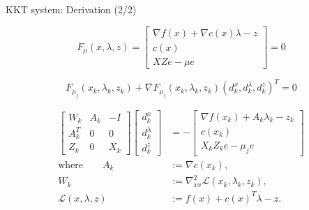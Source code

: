 \documentclass{beamer}
\begin{document}
\begin{frame}{KKT system: Derivation (2/2)}

  \[
    F_\mu(x,\lambda,z) =
    \begin{bmatrix}
      \nabla f(x) + \nabla c(x)\lambda - z \\
      c(x)                                 \\
      XZe - \mu e
    \end{bmatrix} = 0
  \]

  \[
    F_{\mu_j}(x_k,\lambda_k,z_k) + \nabla F_{\mu_j}(x_k,\lambda_k,z_k) (d_k^x, d_k^\lambda, d_k^z)^T = 0
  \]

  \vspace{-1.0em}

  \begin{align*}
    \begin{bmatrix}
      W_k   & A_k & -I  \\
      A_k^T & 0   & 0   \\
      Z_k   & 0   & X_k
    \end{bmatrix}
    \begin{bmatrix}
      d_k^x       \\
      d_k^\lambda \\
      d_k^z
    \end{bmatrix}
                             & =
    -
    \begin{bmatrix}
      \nabla f(x_k) + A_k \lambda_k - z_k \\
      c(x_k)                              \\
      X_k Z_k e - \mu_j e
    \end{bmatrix}                                        \\[0.8em]
    \text{where}\qquad
    A_k                      & := \nabla c(x_k),                               \\
    W_k                      & := \nabla^2_{xx}\mathcal{L}(x_k,\lambda_k,z_k), \\
    \mathcal{L}(x,\lambda,z) & := f(x) + c(x)^T\lambda - z.
  \end{align*}


\end{frame}
\end{document}
